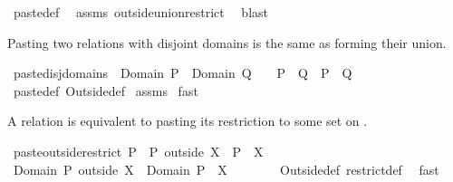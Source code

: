 \begin{isabellebody}
%
\isadelimproof
%
\endisadelimproof
%
\isatagproof
{}\isamarkupfalse%
\ paste{\isacharunderscore}def\ \isamarkupfalse%
\ assms\ outside{\isacharunderscore}union{\isacharunderscore}restrict\ \isamarkupfalse%
\ blast%
\endisatagproof
{\isafoldproof}%
%
\isadelimproof
%
\endisadelimproof
%
\begin{isamarkuptext}%
Pasting two relations with disjoint domains is the same as forming their union.%
\end{isamarkuptext}%
\isamarkuptrue%
\isamarkupfalse%
\ paste{\isacharunderscore}disj{\isacharunderscore}domains{\isacharcolon}\ \ {\isachardoublequoteopen}Domain\ P\ {\isasyminter}\ Domain\ Q\ {\isacharequal}\ {\isacharbraceleft}{\isacharbraceright}{\isachardoublequoteclose}\ \ {\isachardoublequoteopen}P\ {\isacharplus}{\isacharasterisk}\ Q\ {\isacharequal}\ P\ {\isasymunion}\ Q{\isachardoublequoteclose}\isanewline
%
\isadelimproof
%
\endisadelimproof
%
\isatagproof
{}\isamarkupfalse%
\ paste{\isacharunderscore}def\ Outside{\isacharunderscore}def\isanewline
{}\isamarkupfalse%
\ assms\isanewline
{}\isamarkupfalse%
\ fast%
\endisatagproof
{\isafoldproof}%
%
\isadelimproof
%
\endisadelimproof
%
\begin{isamarkuptext}%
A relation  is equivalent to pasting its restriction to some set  on 
  .%
\end{isamarkuptext}%
\isamarkuptrue%
\isamarkupfalse%
\ paste{\isacharunderscore}outside{\isacharunderscore}restrict{\isacharcolon}\ {\isachardoublequoteopen}P\ {\isacharequal}\ {\isacharparenleft}P\ outside\ X{\isacharparenright}\ {\isacharplus}{\isacharasterisk}\ {\isacharparenleft}P\ {\isacharbar}{\isacharbar}\ X{\isacharparenright}{\isachardoublequoteclose}\isanewline
%
\isadelimproof
%
\endisadelimproof
%
\isatagproof
{}\isamarkupfalse%
\ {\isacharminus}\isanewline
\ \ \isamarkupfalse%
\ {\isachardoublequoteopen}Domain\ {\isacharparenleft}P\ outside\ X{\isacharparenright}\ {\isasyminter}\ Domain\ {\isacharparenleft}P\ {\isacharbar}{\isacharbar}\ X{\isacharparenright}\ {\isacharequal}\ {\isacharbraceleft}{\isacharbraceright}{\isachardoublequoteclose}\isanewline
\ \ \ \ \isamarkupfalse%
\ Outside{\isacharunderscore}def\ restrict{\isacharunderscore}def\ \isamarkupfalse%
\ fast\isanewline
\ \ \isamarkupfalse%
\ \isamarkupfalse%

\end{isabellebody}
